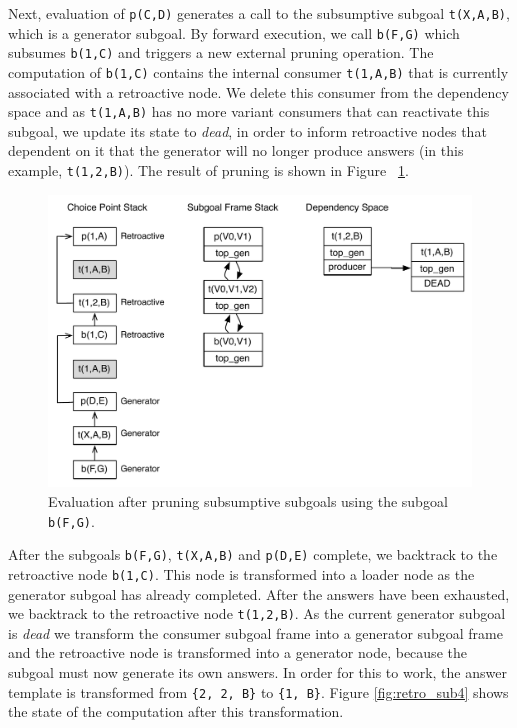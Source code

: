 Next, evaluation of \texttt{p(C,D)} generates a call to the subsumptive subgoal \texttt{t(X,A,B)}, which
is a generator subgoal. By forward execution, we call \texttt{b(F,G)} which subsumes \texttt{b(1,C)} and triggers
a new external pruning operation. The computation of \texttt{b(1,C)} contains the internal consumer
\texttt{t(1,A,B)} that is currently associated with a retroactive node. We delete this consumer from the
dependency space and as \texttt{t(1,A,B)} has no more variant consumers that can reactivate this subgoal,
we update its state to \textit{dead}, in order to inform retroactive nodes that dependent on it that the generator
will no longer produce answers (in this example, \texttt{t(1,2,B)}). The result of pruning is shown in
Figure ~\ref{fig:retro_sub3}.

\begin{figure}[ht]
  \centering
    \includegraphics[scale=0.5]{retro_sub3.pdf}
  \caption{Evaluation after pruning subsumptive subgoals using the subgoal \texttt{b(F,G)}.}
  \label{fig:retro_sub3}
\end{figure}

After the subgoals \texttt{b(F,G)}, \texttt{t(X,A,B)} and \texttt{p(D,E)} complete, we backtrack to
the retroactive node \texttt{b(1,C)}. This node is transformed into a loader node as the generator
subgoal has already completed. After the answers have been exhausted, we backtrack to the retroactive
node \texttt{t(1,2,B)}. As the current generator subgoal is \textit{dead} we transform the consumer subgoal
frame into a generator subgoal frame and the retroactive node is transformed into a generator node, because
the subgoal must now generate its own answers. In order for this to work, the answer template is transformed
from \texttt{\{2,~2,~B\}} to \texttt{\{1,~B\}}. Figure \ref{fig:retro_sub4} shows the state of the computation
after this transformation.

